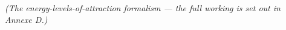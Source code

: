 % 
% 
% 
% 
% 
% 
% 
% 
% 
% 
% 
% 
\textit{(The energy-levels-of-attraction formalism --- the full working is set out in Annexe D.)}

